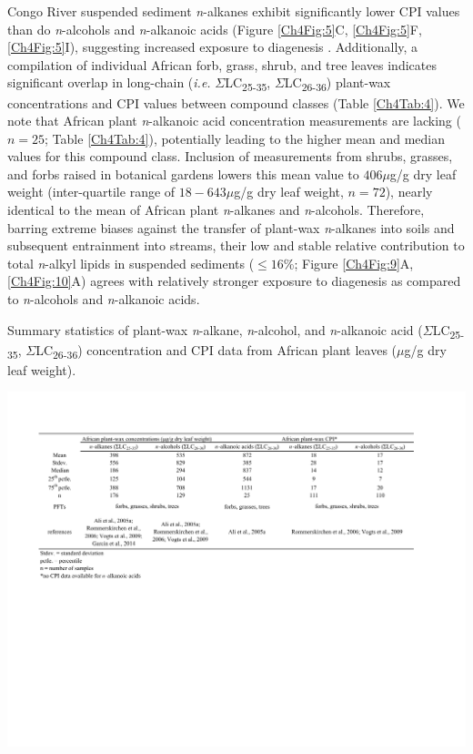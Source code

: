 Congo River suspended sediment \textit{n}-alkanes exhibit significantly lower CPI values than do \textit{n}-alcohols and \textit{n}-alkanoic acids (Figure \ref{Ch4Fig:5}C, \ref{Ch4Fig:5}F, \ref{Ch4Fig:5}I), suggesting increased exposure to diagenesis \citep{Meyers:1993vwa}. Additionally, a compilation of individual African forb, grass, shrub, and tree leaves indicates significant overlap in long-chain (\textit{i.e.} $\Sigma$LC\textsubscript{25-35}, $\Sigma$LC\textsubscript{26-36}) plant-wax concentrations and CPI values between compound classes (Table \ref{Ch4Tab:4}). We note that African plant \textit{n}-alkanoic acid concentration measurements are lacking ($n = 25$; Table \ref{Ch4Tab:4}), potentially leading to the higher mean and median values for this compound class. Inclusion of measurements from shrubs, grasses, and forbs raised in botanical gardens \citep{Gao:2014bk} lowers this mean value to $406 \mu$g/g dry leaf weight (inter-quartile range of $18 - 643 \mu$g/g dry leaf weight, $n = 72$), nearly identical to the mean of African plant \textit{n}-alkanes and \textit{n}-alcohols. Therefore, barring extreme biases against the transfer of plant-wax \textit{n}-alkanes into soils and subsequent entrainment into streams, their low and stable relative contribution to total \textit{n}-alkyl lipids in suspended sediments ($\leq 16$\%; Figure \ref{Ch4Fig:9}A, \ref{Ch4Fig:10}A) agrees with relatively stronger exposure to diagenesis as compared to \textit{n}-alcohols and \textit{n}-alkanoic acids.

\begin{table}
	\caption[African plant leaf lipid distributions and concentrations]{Summary statistics of plant-wax \textit{n}-alkane, \textit{n}-alcohol, and \textit{n}-alkanoic acid ($\Sigma$LC\textsubscript{25-35}, $\Sigma$LC\textsubscript{26-36}) concentration and CPI data from African plant leaves ($\mu$g/g dry leaf weight).}
	\centering
		\includegraphics{Thesis_Tables/Ch4Tab4}
	\label{Ch4Tab:4} 
\end{table}

